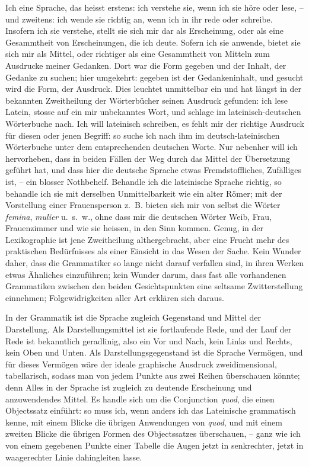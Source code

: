 Ich  eine Sprache, das heisst erstens: ich verstehe sie, wenn ich sie höre oder lese, – und zweitens: ich wende sie richtig an, wenn ich in ihr rede oder schreibe. Insofern ich sie verstehe, stellt sie sich mir dar als Erscheinung, oder  als eine Gesammtheit von Erscheinungen, die ich deute. Sofern ich sie anwende, bietet sie sich mir als Mittel, oder richtiger als eine Gesammtheit von Mitteln zum Ausdrucke meiner Gedanken. Dort war die Form gegeben und der Inhalt, der Gedanke zu suchen; hier umgekehrt: gegeben ist der Gedankeninhalt, und gesucht wird die Form, der Ausdruck. Dies leuchtet unmittelbar ein und hat längst in der bekannten Zweitheilung der Wörterbücher seinen Ausdruck gefunden: ich lese Latein, stosse auf ein mir unbekanntes Wort, \label{sp.85} und schlage im lateinisch-deutschen Wörterbuche nach. Ich will lateinisch schreiben, es fehlt mir der richtige Ausdruck für diesen oder jenen Begriff: so suche ich nach ihm im deutsch-lateinischen Wörterbuche unter dem entsprechenden deutschen Worte. Nur nebenher will ich hervorheben, dass in beiden Fällen der Weg durch das Mittel der Übersetzung geführt hat, und dass hier die deutsche Sprache etwas Fremdstoffliches, Zufälliges ist, – ein blosser Nothbehelf. Behandle ich die lateinische Sprache richtig, so behandle ich sie mit derselben Unmittelbarkeit wie ein alter Römer; mit der Vorstellung einer Frauensperson z.~B. bieten sich mir von selbst die Wörter \textit{femina}, \textit{mulier} u.~s.~w., ohne dass mir die deutschen Wörter Weib, Frau, Frauenzimmer und wie sie heissen, in den Sinn kommen. Genug, in der Lexikographie ist jene Zweitheilung althergebracht, aber eine Frucht mehr des praktischen Bedürfnisses als einer Einsicht in das Wesen der Sache. Kein Wunder daher, dass die Grammatiker so lange nicht darauf verfallen sind, in ihren Werken etwas Ähnliches einzuführen; kein Wunder darum, dass fast alle vorhandenen Grammatiken zwischen den beiden Gesichtspunkten eine seltsame Zwitterstellung einnehmen; Folgewidrigkeiten aller Art erklären sich daraus.

In der Grammatik ist die Sprache zugleich Gegenstand und Mittel der Darstellung. Als Darstellungsmittel ist sie fortlaufende Rede, und der Lauf der Rede ist bekanntlich geradlinig, also ein Vor und Nach, kein Links und Rechts, kein Oben und Unten. Als Darstellungsgegen\label{fp.87}stand ist die Sprache Vermögen, und für dieses Vermögen wäre der ideale graphische Ausdruck zweidimensional, tabellarisch, sodass man von jedem Punkte aus zwei Reihen überschauen könnte; denn Alles in der Sprache ist zugleich zu deutende Erscheinung und anzuwendendes Mittel. Es handle sich um die Conjunction \textit{quod}, die einen Objectssatz einführt: so muss ich, wenn anders ich das Lateinische grammatisch kenne, mit einem Blicke die übrigen Anwendungen von \textit{quod}, und mit einem zweiten Blicke die übrigen Formen des Objectssatzes überschauen, – ganz wie ich von einem gegebenen Punkte einer Tabelle die Augen jetzt in senkrechter, jetzt in waagerechter Linie dahingleiten lasse.

